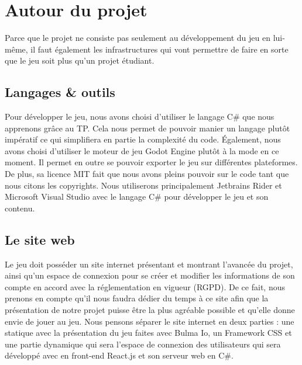 \section{Autour du projet}

Parce que le projet ne consiste pas seulement au développement du jeu en lui-même, il faut également les infrastructures qui vont permettre de faire en sorte que le jeu soit plus qu'un projet étudiant.

\subsection{Langages \& outils}
Pour développer le jeu, nous avons choisi d'utiliser le langage C\# que nous apprenons grâce au TP. Cela nous permet de pouvoir manier un langage plutôt impératif ce qui simplifiera en partie la complexité du code. Également, nous avons choisi d'utiliser le moteur de jeu Godot Engine plutôt à la mode en ce moment. Il permet en outre se pouvoir exporter le jeu sur différentes plateformes. De plus, sa licence MIT fait que nous avons pleins pouvoir sur le code tant que nous citons les copyrights. Nous utiliserons principalement Jetbrains Rider et Microsoft Visual Studio avec le langage C\# pour développer le jeu et son contenu.

\subsection{Le site web}
Le jeu doit posséder un site internet présentant et montrant l'avancée du projet, ainsi qu'un espace de connexion pour se créer et modifier les informations de son compte en accord avec la réglementation en vigueur (RGPD). De ce fait, nous prenons en compte qu'il nous faudra dédier du temps à ce site afin que la présentation de notre projet puisse être la plus agréable possible et qu'elle donne envie de jouer au jeu. Nous pensons séparer le site internet en deux parties : une statique avec la présentation du jeu faites avec Bulma Io, un Framework CSS et une partie dynamique qui sera l'espace de connexion des utilisateurs qui sera développé avec en front-end React.js et son serveur web en C\#.